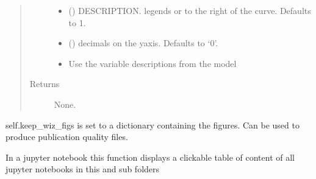 \documentclass[letterpaper,10pt,english]{sphinxmanual}
\begin{document}
\begin{fulllineitems}
\begin{fulllineitems}
\begin{quote}
\begin{description}
\begin{itemize}
\item {} 
\sphinxAtStartPar
{} (\sphinxstyleliteralemphasis{\sphinxupquote{, }}) \textendash{} DESCRIPTION. legends or to the right of the curve. Defaults to 1.

\item {} 
\sphinxAtStartPar
{} (\sphinxstyleliteralemphasis{\sphinxupquote{, }}) \textendash{} decimals on the y\sphinxhyphen{}axis. Defaults to ‘0’.

\item {} 
\sphinxAtStartPar
{} \textendash{} Use the variable descriptions from the model

\end{itemize}

\item[{Returns}] \leavevmode
\sphinxAtStartPar
None.

\end{description}\end{quote}

\sphinxAtStartPar
self.keep\_wiz\_figs is set to a dictionary containing the figures. Can be used to produce publication
quality files.

\end{fulllineitems}


\begin{fulllineitems}
\label{\detokenize{core/modelclass:modelclass.Display_Mixin.display_toc}}
\pysigstartsignatures
{}
\pysigstopsignatures
\sphinxAtStartPar
In a jupyter notebook this function displays a clickable table of content of all
jupyter notebooks in this and sub folders

\end{fulllineitems}


\end{fulllineitems}
\end{document}
